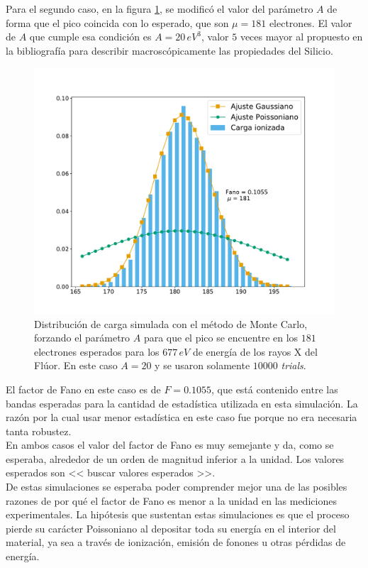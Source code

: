 \noindent Para el segundo caso, en la figura \ref{fig:Simulacion1rden1Fano2}, se modificó el valor del parámetro $A$ de forma que el pico coincida con lo esperado, que son $\mu = 181$ electrones. El valor de $A$ que cumple esa condición es $A = 20\,\si{eV}^{3}$, valor $5$ veces mayor al propuesto en la bibliografía para describir macroscópicamente las propiedades del Silicio.
\begin{figure}%
    \centering
    \includegraphics[scale=0.35]{Figs/Fano_677_Eloss0_10ktrials.pdf}
    \caption{\footnotesize{Distribución de carga simulada con el método de Monte Carlo, forzando el parámetro $A$ para que el pico se encuentre en los $181$ electrones esperados para los $677\,\si{eV}$ de energía de los rayos X del Flúor. En este caso $A=20$ y se usaron solamente $10000$ \textit{trials}.}}
    \label{fig:Simulacion1rden1Fano2}
\end{figure}
El factor de Fano en este caso es de $F = 0.1055$, que está contenido entre las bandas esperadas para la cantidad de estadística utilizada en esta simulación. La razón por la cual usar menor estadística en este caso fue porque no era necesaria tanta robustez.\\
\indent En ambos casos el valor del factor de Fano es muy semejante y da, como se esperaba, alrededor de un orden de magnitud inferior a la unidad. Los valores esperados son << buscar valores esperados >>.\\
\indent De estas simulaciones se esperaba poder comprender mejor una de las posibles razones de por qué el factor de Fano es menor a la unidad en las mediciones experimentales. La hipótesis que sustentan estas simulaciones es que el proceso pierde su carácter Poissoniano al depositar toda su energía en el interior del material, ya sea a través de ionización, emisión de fonones u otras pérdidas de energía.
